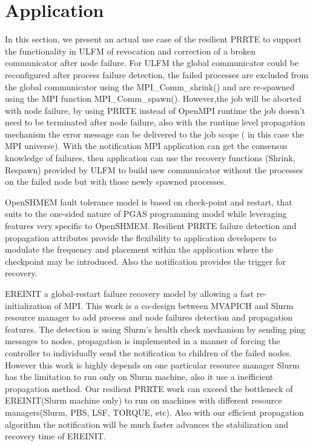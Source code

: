 \documentclass[sigconf]{acmart}
\begin{document}
\section{Application}
In this section, we present an actual use case of the resilient PRRTE to support the functionality in ULFM of revocation and correction of a broken communicator after node failure. For ULFM the global communicator could be reconfigured after process failure detection, the failed processes are excluded from the global communicator using the MPI\_Comm\_shrink() and are re-spawned using the MPI function MPI\_Comm\_spawn(). However,the job will be aborted with node failure, by using PRRTE instead of OpenMPI runtime the job doesn't need to be terminated after node failure, also with the runtime level propagation mechanism the error message can be delivered to the job scope ( in this case the MPI universe). With the notification MPI application can get the consensus knowledge of failures, then application can use the recovery functions (Shrink, Respawn) provided by ULFM to build new communicator without the processes on the failed node but with those newly spawned processes. 

OpenSHMEM fault tolerance model is based on check-point and restart, that suits to the one-sided nature of PGAS programming model while leveraging features very specific to OpenSHMEM. Resilient PRRTE failure detection and propagation attributes provide the flexibility to application developers to modulate the frequency and placement within the application where the checkpoint may be introduced. Also the notification provides the trigger for recovery. 

EREINIT a global-restart failure recovery model by allowing a fast re-initialization of MPI. This work is a co-design between MVAPICH and Slurm resource manager to add process and node failures detection and propagation features. The detection is using Slurm's health check mechanism by sending ping messages to nodes, propagation is implemented in a manner of forcing the controller to individually send the notification to children of the failed nodes. However this work is highly depends on one particular resource manager Slurm has the limitation to run only on Slurm machine, also it use a inefficient propagation method. Our resilient PRRTE work can exceed the bottleneck of EREINIT(Slurm machine only) to run on machines with different resource managers(Slurm, PBS, LSF, TORQUE, etc). Also with our efficient propagation algorithm the notification will be much faster advances the stabilization and recovery time of EREINIT.
\end{document}
